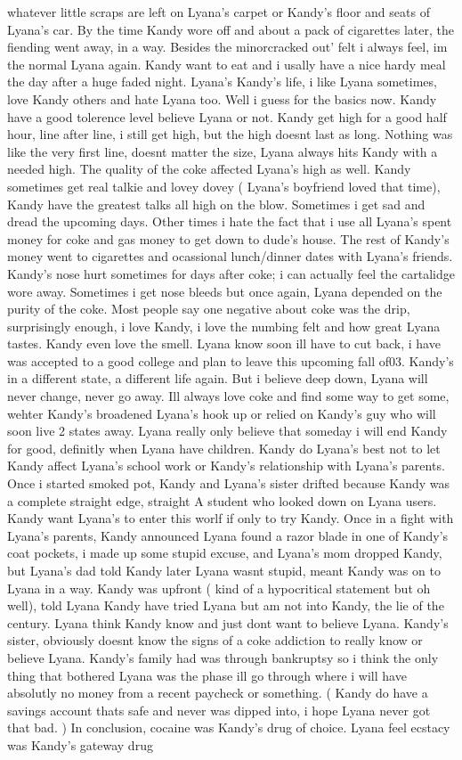 \documentclass[12pt]{book}
\begin{document}
whatever little scraps are left on Lyana's carpet or Kandy's floor and seats of Lyana's car. By the time Kandy wore off and about a pack of cigarettes later, the fiending went away, in a way. Besides the minorcracked out' felt i always feel, im the normal Lyana again. Kandy want to eat and i usally have a nice hardy meal the day after a huge faded night. Lyana's Kandy's life, i like Lyana sometimes, love Kandy others and hate Lyana too. Well i guess for the basics now. Kandy have a good tolerence level believe Lyana or not. Kandy get high for a good half hour, line after line, i still get high, but the high doesnt last as long. Nothing was like the very first line, doesnt matter the size, Lyana always hits Kandy with a needed high. The quality of the coke affected Lyana's high as well. Kandy sometimes get real talkie and lovey dovey ( Lyana's boyfriend loved that time), Kandy have the greatest talks all high on the blow. Sometimes i get sad and dread the upcoming days. Other times i hate the fact that i use all Lyana's spent money for coke and gas money to get down to dude's house. The rest of Kandy's money went to cigarettes and ocassional lunch/dinner dates with Lyana's friends. Kandy's nose hurt sometimes for days after coke; i can actually feel the cartalidge wore away. Sometimes i get nose bleeds but once again, Lyana depended on the purity of the coke. Most people say one negative about coke was the drip, surprisingly enough, i love Kandy, i love the numbing felt and how great Lyana tastes. Kandy even love the smell. Lyana know soon ill have to cut back, i have was accepted to a good college and plan to leave this upcoming fall of03. Kandy's in a different state, a different life again. But i believe deep down, Lyana will never change, never go away. Ill always love coke and find some way to get some, wehter Kandy's broadened Lyana's hook up or relied on Kandy's guy who will soon live 2 states away. Lyana really only believe that someday i will end Kandy for good, definitly when Lyana have children. Kandy do Lyana's best not to let Kandy affect Lyana's school work or Kandy's relationship with Lyana's parents. Once i started smoked pot, Kandy and Lyana's sister drifted because Kandy was a complete straight edge, straight A student who looked down on Lyana users. Kandy want Lyana's to enter this worlf if only to try Kandy. Once in a fight with Lyana's parents, Kandy announced Lyana found a razor blade in one of Kandy's coat pockets, i made up some stupid excuse, and Lyana's mom dropped Kandy, but Lyana's dad told Kandy later Lyana wasnt stupid, meant Kandy was on to Lyana in a way. Kandy was upfront ( kind of a hypocritical statement but oh well), told Lyana Kandy have tried Lyana but am not into Kandy, the lie of the century. Lyana think Kandy know and just dont want to believe Lyana. Kandy's sister, obviously doesnt know the signs of a coke addiction to really know or believe Lyana. Kandy's family had was through bankruptsy so i think the only thing that bothered Lyana was the phase ill go through where i will have absolutly no money from a recent paycheck or something. ( Kandy do have a savings account thats safe and never was dipped into, i hope Lyana never got that bad. ) In conclusion, cocaine was Kandy's drug of choice. Lyana feel ecstacy was Kandy's gateway drug 
\end{document}
